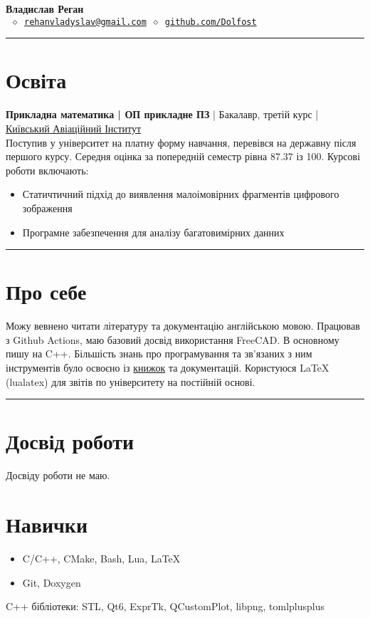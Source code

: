 


\newcommand{\crule}{\par\noindent\rule{\textwidth}{0.5pt}}


\thispagestyle{empty}

\begin{center}
	\LARGE \textbf{Владислав Реган}\\[4mm] \normalsize
	\texttt{ \(\diamond\)\
	\href{mailto:rehanvladyslav@gmail.com}{rehanvladyslav@gmail.com} \(\diamond\)
	\url{github.com/Dolfost}}
\end{center}
\crule
\section{Освіта}
\textbf{Прикладна математика | ОП прикладне ПЗ} | Бакалавр, третій курс | \href{http://nau.edu.ua/en/}{Київський Авіаційний Інститут}\\
Поступив у університет на платну форму навчання, перевівся на державну після першого курсу.
Середня оцінка за попередній семестр рівна 87.37 із 100.
Курсові роботи включають:
\begin{itemize}
	\item Статичтичний підхід до виявлення малоімовірних фрагментів цифрового зображення
	\item Програмне забезпечення для аналізу багатовимірних данних
\end{itemize}

\crule
\section{Про себе}
Можу вевнено читати літературу та документацію англійською мовою. Працював з
Github Actions, маю базовий досвід використання FreeCAD. В основному пишу на
C++. Більшість знань про програмування та зв'язаних з ним інструментів було
освоєно із
\href{https://github.com/Dolfost/Dolfost/blob/main/README.md#literature--sources}{книжок}
та документацій. Користуюся LaTeX (lualatex) для звітів по університету на
постійній основі.

\crule
\section{Досвід роботи}
Досвіду роботи не маю.

\section{Навички}
\begin{itemize}
	\item C/C++, CMake, Bash, Lua, LaTeX
	\item Git, Doxygen
\end{itemize}
C++ бібліотеки: STL, Qt6, ExprTk, QCustomPlot, libpng, tomlplusplus

